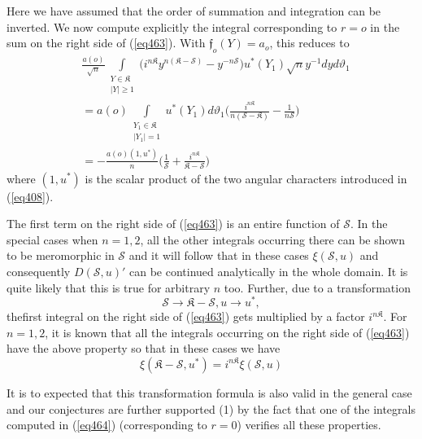Here we have assumed that the order of summation and integration can
be inverted. We now compute explicitly the integral corresponding to
$r=o$ in the sum on the right side of (\ref{eq463}). With
$\mathfrak{f}_o(Y)=a_o$, this reduces to  
\begin{align*}
&\frac{a(o)}{\sqrt{n}} \int\limits_{\substack{Y \in \mathfrak{K}  \\ | Y
      | \ge  1}} \big(i^{n   \mathfrak{K}}   y^{n   (\mathfrak{K}-
    \mathscr{S})} -y^{-n \mathscr{S}}\big)   u^*   (Y_1)   \sqrt{n}
  y^{-1}   dy  d \vartheta_1 \\ 
&= a(o) \int\limits_{\substack{Y_{1}   \in   \mathfrak{K} \\ | Y_{1} |
      = 1}}   u^*   (Y_1)   d \vartheta_1 \Bigg(\frac{i^{n
      \mathfrak{K}}}{n(\mathscr{S}-\mathfrak{K})}- \frac{1}{n
    \mathscr{S}}\Bigg) \\ 
& = -\frac{a(o)(1, u^*)}{n} \Bigg( \frac{1}{\mathscr{S}}+ \frac{i^{n
      \mathfrak{K}}}{\mathfrak{K}-\mathscr{S}} \Bigg) \tag{464}\label{eq464} 
\end{align*}\pageoriginale
where $(1, u^*)$ is the scalar product of the two angular characters
introduced in (\ref{eq408}). 

The first term on the right side of (\ref{eq463}) is an entire function of
$\mathscr{S}$. In the special cases when $n = 1, 2$, all the other
integrals occurring there can be shown to be meromorphic in
$\mathscr{S}$ and it will follow that in these cases $\xi
(\mathscr{S}, u)$ and consequently $D(\mathscr{S}, u)'$ can be continued
analytically in the whole domain. It is quite likely that this is true
for arbitrary $n$ too. Further, due to a transformation 
$$
\mathscr{S} \to \mathfrak{K}- \mathscr{S},   u \to u^* ,
$$
the\pageoriginale first integral on the right side of (\ref{eq463})
gets multiplied by a factor $i^{n \mathfrak{K}}$. For $n=1,2$, it is
known that all the integrals occurring on the right side of
(\ref{eq463}) have the above property so that in these cases we have  
\begin{equation*}
\xi (\mathfrak{K}-\mathscr{S}, u^*) = i^{n \mathfrak{K}} \xi
(\mathscr{S}, u) \tag{465}\label{eq465} 
\end{equation*}

It is to expected that this transformation formula is also valid in
the general case and our conjectures are further supported (1) by
the fact that one of the integrals computed in (\ref{eq464}) (corresponding
to $r=0$) verifies all these properties. 


